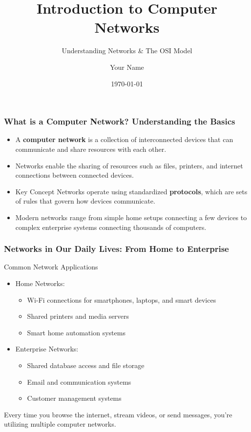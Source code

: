 \documentclass{beamer}
\title{Introduction to Computer Networks}
\subtitle{Understanding Networks \& The OSI Model}
\author{Your Name}
\institute{Institution Name}
\date{\today}
\begin{document}
\begin{frame}
    \titlepage
\end{frame}

\begin{frame}
    \frametitle{What is a Computer Network? Understanding the Basics}
    
    \begin{itemize}
        \item A \textbf{computer network} is a collection of interconnected devices that can communicate and share resources with each other.
        
        \item Networks enable the sharing of resources such as files, printers, and internet connections between connected devices.
        
        \item \begin{alertblock}{Key Concept}
            Networks operate using standardized \textbf{protocols}, which are sets of rules that govern how devices communicate.
        \end{alertblock}
        
        \item Modern networks range from simple home setups connecting a few devices to complex enterprise systems connecting thousands of computers.
    \end{itemize}
\end{frame}

\begin{frame}
    \frametitle{Networks in Our Daily Lives: From Home to Enterprise}
    
    \begin{block}{Common Network Applications}
        \begin{itemize}
            \item Home Networks:
            \begin{itemize}
                \item Wi-Fi connections for smartphones, laptops, and smart devices
                \item Shared printers and media servers
                \item Smart home automation systems
            \end{itemize}
            
            \item Enterprise Networks:
            \begin{itemize}
                \item Shared database access and file storage
                \item Email and communication systems
                \item Customer management systems
            \end{itemize}
        \end{itemize}
    \end{block}
    
    Every time you browse the internet, stream videos, or send messages, you're utilizing multiple computer networks.
\end{frame}
\end{document}
